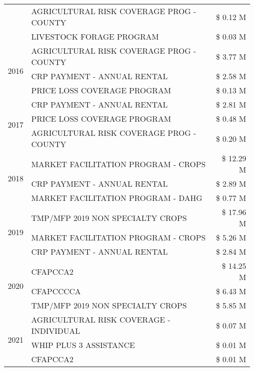 \begin{tabular}{llr}
 & AGRICULTURAL RISK COVERAGE PROG - COUNTY & \$ 0.12 M \\
 & LIVESTOCK FORAGE PROGRAM & \$ 0.03 M \\
\cline{1-3}
\multirow[t]{3}{*}{2016} & AGRICULTURAL RISK COVERAGE PROG - COUNTY      & \$ 3.77 M \\
 & CRP PAYMENT - ANNUAL RENTAL                   & \$ 2.58 M \\
 & PRICE LOSS COVERAGE PROGRAM                   & \$ 0.13 M \\
\cline{1-3}
\multirow[t]{3}{*}{2017} & CRP PAYMENT - ANNUAL RENTAL & \$ 2.81 M \\
 & PRICE LOSS COVERAGE PROGRAM & \$ 0.48 M \\
 & AGRICULTURAL RISK COVERAGE PROG - COUNTY & \$ 0.20 M \\
\cline{1-3}
\multirow[t]{3}{*}{2018} & MARKET FACILITATION PROGRAM - CROPS & \$ 12.29 M \\
 & CRP PAYMENT - ANNUAL RENTAL & \$ 2.89 M \\
 & MARKET FACILITATION PROGRAM - DAHG & \$ 0.77 M \\
\cline{1-3}
\multirow[t]{3}{*}{2019} & TMP/MFP 2019 NON SPECIALTY CROPS & \$ 17.96 M \\
 & MARKET FACILITATION PROGRAM - CROPS & \$ 5.26 M \\
 & CRP PAYMENT - ANNUAL RENTAL & \$ 2.84 M \\
\cline{1-3}
\multirow[t]{3}{*}{2020} & CFAPCCA2 & \$ 14.25 M \\
 & CFAPCCCCA & \$ 6.43 M \\
 & TMP/MFP 2019 NON SPECIALTY CROPS & \$ 5.85 M \\
\cline{1-3}
\multirow[t]{3}{*}{2021} & AGRICULTURAL RISK COVERAGE - INDIVIDUAL & \$ 0.07 M \\
 & WHIP PLUS 3 ASSISTANCE & \$ 0.01 M \\
 & CFAPCCA2 & \$ 0.01 M \\
\cline{1-3}
\bottomrule
\end{tabular}
